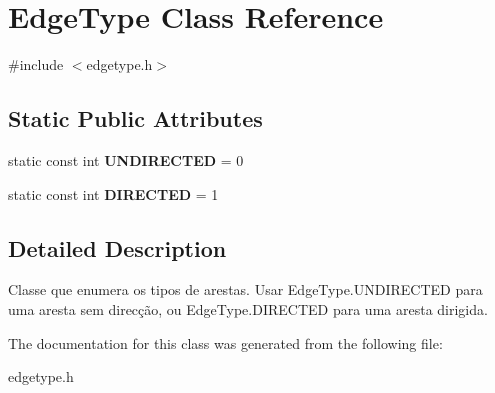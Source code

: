 \hypertarget{class_edge_type}{}\section{Edge\+Type Class Reference}
\label{class_edge_type}


{\ttfamily \#include $<$edgetype.\+h$>$}

\subsection*{Static Public Attributes}
\begin{DoxyCompactItemize}
\item 
\mbox{\label{class_edge_type_a6533cc56d05c288a550b9980b66c9317}} 
static const int {\bfseries U\+N\+D\+I\+R\+E\+C\+T\+ED} = 0
\item 
\mbox{\label{class_edge_type_a903017a534f2818c2d17145e4ae0321c}} 
static const int {\bfseries D\+I\+R\+E\+C\+T\+ED} = 1
\end{DoxyCompactItemize}


\subsection{Detailed Description}
Classe que enumera os tipos de arestas. Usar Edge\+Type.\+U\+N\+D\+I\+R\+E\+C\+T\+ED para uma aresta sem direcção, ou Edge\+Type.\+D\+I\+R\+E\+C\+T\+ED para uma aresta dirigida. 

The documentation for this class was generated from the following file\+:\begin{DoxyCompactItemize}
\item 
edgetype.\+h\end{DoxyCompactItemize}
